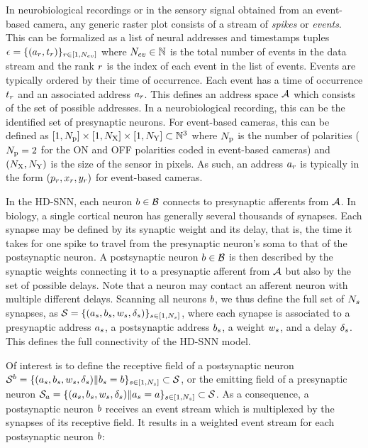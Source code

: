 \documentclass[default]{sn-jnl}%
\theoremstyle{thmstyleone}%
\theoremstyle{thmstyletwo}%
\theoremstyle{thmstylethree}%
\begin{document}
In neurobiological recordings or in the sensory signal obtained from an event-based camera, any generic raster plot consists of a stream of \emph{spikes} or \emph{events}. This can be formalized as a list of neural addresses and timestamps tuples $\epsilon = \{(a_r, t_r)\}_{r \in [1,N_{ev}]}$ where $N_{ev} \in \mathbb{N} $ is the total number of events in the data stream and the rank $r$ is the index of each event in the list of events. Events are typically ordered by their time of occurrence. Each event has a time of occurrence $t_r$ and an associated address $a_r$. This defines an address space $\mathcal{A}$ which consists of the set of possible addresses. In a neurobiological recording, this can be the identified set of presynaptic neurons. For event-based cameras, this can be defined as $[1, N_\text{p}] \times [1, N_\text{X}]\times[1, N_\text{Y}] \subset \mathbb{N}^3$ where $N_\text{p}$ is the number of polarities ($N_\text{p}=2$ for the ON and OFF polarities coded in event-based cameras) and $(N_\text{X}, N_\text{Y})$ is the size of the sensor in pixels. As such, an address $a_r$ is typically in the form $(p_r, x_r, y_r)$ for event-based cameras.

In the HD-SNN, each neuron $b \in \mathcal{B}$ connects to presynaptic afferents from $\mathcal{A}$. In biology, a single cortical neuron has generally several thousands of synapses. Each synapse may be defined by its synaptic weight and its delay, that is, the time it takes for one spike to travel from the presynaptic neuron's soma to that of the postsynaptic neuron. A postsynaptic neuron $b \in \mathcal{B}$ is then described by the synaptic weights connecting it to a presynaptic afferent from $\mathcal{A}$ but also by the set of possible delays. Note that a neuron may contact an afferent neuron with multiple different delays. Scanning all neurons $b$, we thus define the full set of $N_{s}$ synapses, 
as  $\mathcal{S} = \{(a_s, b_s, w_s, \delta_s)\}_{s \in [1,N_{s}]}$, where each synapse is associated to a presynaptic address $a_s$, a postsynaptic address $b_s$, a weight $w_s$, and a delay $\delta_s$. This defines the full connectivity of the HD-SNN model. 

Of interest is to define the receptive field of a postsynaptic neuron $\mathcal{S}^b =  \{(a_s, b_s, w_s, \delta_s) \| b_s=b\}_{s \in [1,N_{s}]}  \subset \mathcal{S}$, or the emitting field of a presynaptic neuron $\mathcal{S}_a =  \{(a_s, b_s, w_s, \delta_s) \| a_s=a\}_{s \in [1,N_{s}]} \subset \mathcal{S}$. As a consequence, a postsynaptic neuron $b$ receives an event stream which is multiplexed by the synapses of its receptive field. It results in a weighted event stream for each  postsynaptic neuron $b$: 
\end{document}
